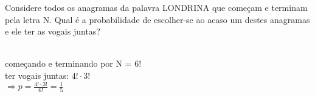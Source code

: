 \begin{ex}
Considere todos os anagramas da palavra LONDRINA que começam e terminam pela letra N. Qual é a probabilidade de escolher-se ao acaso um destes anagramas e ele ter as vogais juntas?
  \begin{sol}
    \phantom{A} \\ 
    começando e terminando por N = $6!$ \\
    ter vogais juntas: $4!\cdot3!$  \\
    $\Longrightarrow p = \frac{4!\cdot3!}{6!}=\frac{1}{5}$
  \end{sol}
\end{ex}